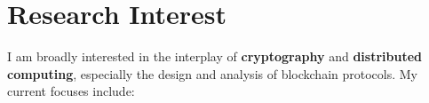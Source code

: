 \section{Research Interest}

\cvitem{}
{I am broadly interested in the interplay of \textbf{cryptography} and \textbf{distributed computing}, especially the design and analysis of blockchain protocols. My current focuses include:}
%
%
